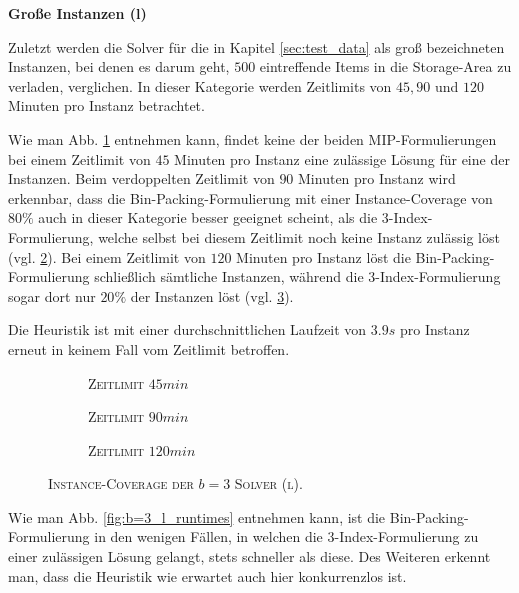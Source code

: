 \vfill
\pagebreak

\textbf{Große Instanzen (l)}

Zuletzt werden die Solver für die in Kapitel \ref{sec:test_data} als groß bezeichneten Instanzen,
bei denen es darum geht, $500$ eintreffende Items in die Storage-Area zu verladen, verglichen.
In dieser Kategorie werden Zeitlimits von $45, 90$ und $120$ Minuten pro Instanz betrachtet.

Wie man Abb. \ref{fig:instance_coverage_b=3_l_a} entnehmen kann, findet keine der beiden MIP-Formulierungen
bei einem Zeitlimit von $45$ Minuten pro Instanz eine zulässige Lösung für eine der Instanzen.
Beim verdoppelten Zeitlimit von $90$ Minuten pro Instanz wird erkennbar, dass die Bin-Packing-Formulierung
mit einer Instance-Coverage von $80 \%$ auch in dieser Kategorie besser geeignet scheint, als die 3-Index-Formulierung,
welche selbst bei diesem Zeitlimit noch keine Instanz zulässig löst (vgl. \ref{fig:instance_coverage_b=3_l_b}).
Bei einem Zeitlimit von $120$ Minuten pro Instanz löst die Bin-Packing-Formulierung schließlich sämtliche Instanzen,
während die 3-Index-Formulierung sogar dort nur $20 \%$ der Instanzen löst (vgl. \ref{fig:instance_coverage_b=3_l_c}).

Die Heuristik ist mit einer durchschnittlichen Laufzeit von $3.9s$ pro Instanz erneut in keinem Fall
vom Zeitlimit betroffen.

\begin{figure}[H]
\centering

\begin{subfigure}[b]{0.3\textwidth}
\centering
\caption{\textsc{Zeitlimit} $45min$}
\label{fig:instance_coverage_b=3_l_a}
\end{subfigure}
\hfill
\begin{subfigure}[b]{0.3\textwidth}
\centering
\caption{\textsc{Zeitlimit} $90min$}
\label{fig:instance_coverage_b=3_l_b}
\end{subfigure}
\hfill
\begin{subfigure}[b]{0.3\textwidth}
\centering
\caption{\textsc{Zeitlimit} $120min$}
\label{fig:instance_coverage_b=3_l_c}
\end{subfigure}
\caption{\textsc{Instance-Coverage der $b = 3$ Solver (l)}.}
\label{}
\end{figure}

Wie man Abb. \ref{fig:b=3_l_runtimes} entnehmen kann, ist die Bin-Packing-Formulierung in den wenigen
Fällen, in welchen die 3-Index-Formulierung zu einer zulässigen Lösung gelangt, stets schneller
als diese. Des Weiteren erkennt man, dass die Heuristik wie erwartet auch hier konkurrenzlos ist.

